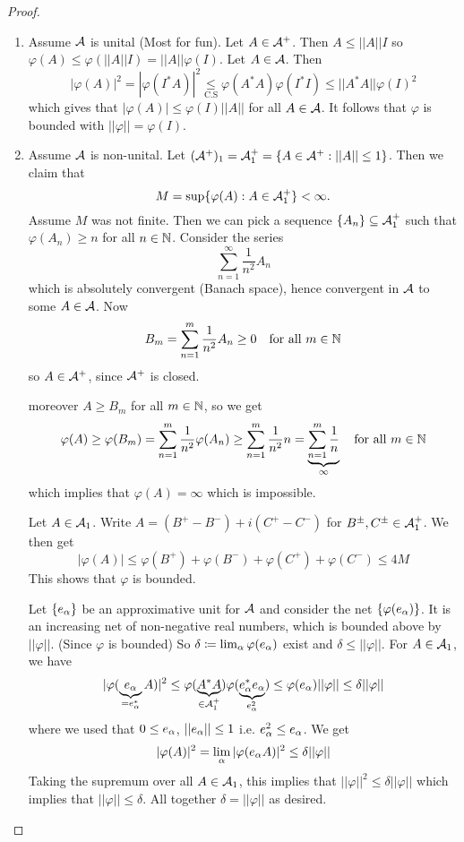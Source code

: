 \documentclass[10pt,english,a4paper]{article}
\theoremstyle{definition}
\def\vphi{\varphi}
\begin{document}
\begin{proof}
\begin{enumerate}[(1)]
    \item 
    Assume $\mathcal{A}$ is unital (Most for fun). Let $A \in \mathcal{A}^+$. Then $A \leq ||A||I$
so $\varphi(A)\leq \varphi(||A|| I) = ||A|| \varphi(I)$. Let $A \in \mathcal{A}$. 
Then 
\[|\varphi(A)|^2 = |\varphi(I^*A)|^2 \underset{\text{C.S}}{\leq} 
\varphi(A^*A)\varphi(I^*I) \leq ||A^*A||\varphi(I)^2\]
which gives that $|\varphi(A)|\leq \varphi(I)||A||$ for all $A \in \mathcal{A}$. 
It follows that $\varphi$ is bounded with $||\varphi|| = \varphi(I)$.

\item Assume $\mathcal{A}$ is non-unital. Let $(\mathcal{A}^+)_1 = \mathcal{A}_{1}^{+} = \{A \in \mathcal{A}^+: ||A||\leq 1\}$.
Then we claim that 
\[ M = \sup\{ \varphi(A) : A \in \mathcal{A}^{+}_{1} \}< \infty. \]
Assume $M$ was not finite. Then we can pick a sequence $\{A_n\} \subseteq \mathcal{A}_{1}^{+}$
such that $\varphi(A_n) \geq n$ for all $n \in \mathbb{N}$. Consider the series 
\[ \sum_{n=1}^{\infty}\frac{1}{n^2} A_n \]
which is absolutely convergent (Banach space), hence convergent in $\mathcal{A}$ to some $A \in \mathcal{A}$.
Now 
\[B_m = \sum_{n=1}^{m}\frac{1}{n^2}A_n \geq 0 \quad \text{for all }m \in \mathbb{N}\]
so $A \in \mathcal{A}^+$, since $\mathcal{A}^+$ is closed. 

moreover $A \geq B_m$ for all $m \in \mathbb{N}$, so we get 
\[\varphi(A)\geq \varphi(B_m) = \sum_{n=1}^{m} \frac{1}{n^2}\vphi(A_n) \geq \sum_{n=1}^{m} 
\frac{1}{n^2}n  = \ub{\sum_{n=1}^{m} \frac{1}{n}}_{\infty} \quad \text{for all }m\in \N  \]
which implies that $\varphi(A)=\infty$ which is impossible. 

Let $A \in \mathcal{A}_1$. Write $A = (B^+-B^-) + i (C^+-C^-)$ for $B^{\pm},C^{\pm}\in \mathcal{A}_{1}^{+}$.
We then get 
\[ |\varphi(A)| \leq \varphi(B^+) + \varphi(B^-) + \varphi(C^+) + \varphi(C^-)\leq 4M\]
This shows that $\varphi$ is bounded. 

Let $\{e_{\alpha}\}$ be an approximative unit for $\mathcal{A}$ and consider the net 
$\{\varphi(e_{\alpha})\}$. It is an increasing net of non-negative real numbers, which 
is bounded above by $||\varphi||$. (Since $\varphi$ is bounded) So $
\delta \coloneqq \lim_{\alpha} \varphi(e_{\alpha})$ exist and $\delta \leq ||\varphi||$.
For $A \in \mathcal{A}_1$, we have 
\[|\varphi(\underbrace{e_{\alpha}}_{=e_{\alpha}^{*}}A)|^2\leq \varphi(\underbrace{A^*A}_{\in
\mathcal{A}_{1}^{+}})\varphi(\underbrace{e_{\alpha}^*e_{\alpha}}_{e_{\alpha}^{2}}) \leq
\varphi(e_{\alpha})||\varphi||\leq \delta ||\varphi||\]
where we used that $0 \leq e_{\alpha}$, $||e_{\alpha}|| \leq 1$ i.e. $e_{\alpha}^{2}\leq e_{\alpha}$.
We get 
\[ |\varphi(A)|^2 = \lim_{\alpha}|\varphi(e_{\alpha}A)|^2 \leq \delta||\varphi|| \]
Taking the supremum over all $A \in \mathcal{A}_1$, this implies that $||\varphi||^2 \leq \delta ||\varphi||$ which  implies that
$||\varphi||\leq \delta$. All together $\delta = ||\varphi||$ as desired. 
\end{enumerate}
\end{proof}
\end{document}
